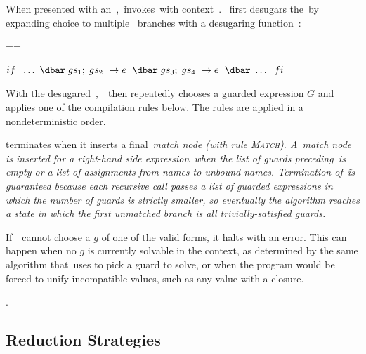 \documentclass[article,screen,12pt, nonacm]{acmart}
\begin{document}
       




    When presented with an~\iffibf,~\DTran\~invokes~\Compile with context~\ctx.
    \Compile~first desugars the~\iffibf by expanding choice to multiple~\iffibf
    branches with a desugaring function~\ITran: 
    
    
    ==
    
    ${if\;~\dots~\dbar\; gs_{1};\; gs_{2}~\rightarrow e~\;\dbar\; gs_{3};\; gs_{4}~\rightarrow e~\;\dbar~\dots~\;fi}$

    With the desugared~\iffibf,~\Compile\ then repeatedly chooses a guarded
    expression $G$ and applies one of the compilation rules below. The rules are
    applied in a nondeterministic order. 

    \Compile terminates when it inserts a final~\it{match} node (with rule
    \textsc{Match}).  A~\it{match} node is inserted for a right-hand side expression~\expr when the list of
    guards preceding~\expr is empty or a list of assignments from names to
    unbound names. Termination of~\DTran\~is guaranteed because each recursive
    call passes a list of guarded expressions in which the number of guards is
    strictly smaller, so eventually the algorithm reaches a state in which the
    first unmatched branch is all trivially-satisfied guards.


    If~\Compile\ cannot choose a $g$ of one of the valid forms, it halts with an
    error. This can happen when no $g$ is currently solvable in the context, as
    determined by the same algorithm that~\VMinus uses to pick a guard to solve,
    or when the program would be forced to unify incompatible values, such as
    any value with a closure. 

    .

    

      \subsection{Reduction Strategies}
\end{document}
